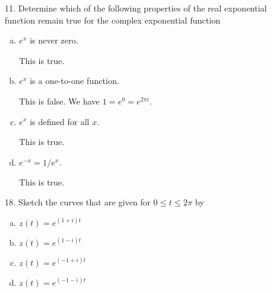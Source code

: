 \documentclass{article}
\begin{document}
\begin{itemize}
	\item[11.] Determine which of the following properties of the real exponential function remain true for the complex exponential function
		\begin{enumerate}[(a)]
			\item $e^x$ is never zero.
				\begin{answer*}
					This is true.
				\end{answer*}

			\item $e^x$ is a one-to-one function.
				\begin{answer*}
					This is false. We have $1=e^{0}=e^{2\pi i}.$
				\end{answer*}

			\item $e^x$ is defined for all $x.$
				\begin{answer*}
					This is true.
				\end{answer*}

			\item $e^{-x}=1/e^x.$
				\begin{answer*}
					This is true.
				\end{answer*}
				
		\end{enumerate}

	\item[18.] Sketch the curves that are given for $0\le t\le 2\pi$ by
		\begin{enumerate}[(a)]
			\item $z(t)=e^{(1+i)t}$ 
				
			\item $z(t)=e^{(1-i)t}$ 

			\item $z(t)=e^{(-1+i)t}$

			\item $z(t)=e^{(-1-i)t}$
				
		\end{enumerate}


\end{itemize}
\end{document}
